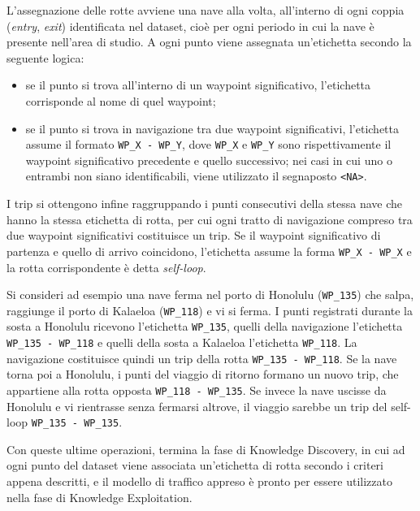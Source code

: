 L'assegnazione delle rotte avviene una nave alla volta, all'interno di ogni coppia
(\emph{entry}, \emph{exit}) identificata nel dataset, cioè per ogni periodo in cui la nave è presente
nell'area di studio. A ogni punto viene assegnata un'etichetta secondo la seguente logica:
\begin{itemize}
    \item se il punto si trova all'interno di un waypoint significativo, l'etichetta
          corrisponde al nome di quel waypoint;
    \item se il punto si trova in navigazione tra due waypoint significativi, l'etichetta assume il
          formato \texttt{WP\_X - WP\_Y}, dove \texttt{WP\_X} e \texttt{WP\_Y} sono
          rispettivamente il waypoint significativo precedente e quello successivo; nei casi
          in cui uno o entrambi non siano identificabili, viene utilizzato il
          segnaposto \texttt{<NA>}.
\end{itemize}
I trip si ottengono infine raggruppando i punti consecutivi della stessa nave che hanno la stessa
etichetta di rotta, per cui ogni tratto di navigazione compreso tra due waypoint significativi
costituisce un trip. Se il waypoint significativo di partenza e quello di arrivo coincidono, l'etichetta
assume la forma
\texttt{WP\_X - WP\_X} e la rotta corrispondente è detta \emph{self-loop}.

Si consideri ad esempio una nave ferma nel porto di Honolulu (\texttt{WP\_135}) che salpa, raggiunge
il porto di Kalaeloa (\texttt{WP\_118}) e vi si ferma. I punti registrati durante la sosta a Honolulu
ricevono l'etichetta \texttt{WP\_135}, quelli della navigazione l'etichetta \texttt{WP\_135 - WP\_118}
e quelli della sosta a Kalaeloa l'etichetta \texttt{WP\_118}. La navigazione costituisce quindi un trip
della rotta \texttt{WP\_135 - WP\_118}. Se la nave torna poi a Honolulu, i punti del viaggio di ritorno
formano un nuovo trip, che appartiene alla rotta opposta \texttt{WP\_118 - WP\_135}. Se invece la nave
uscisse da Honolulu e vi rientrasse senza fermarsi altrove, il viaggio sarebbe un trip del self-loop
\texttt{WP\_135 - WP\_135}.

Con queste ultime operazioni, termina la fase di Knowledge Discovery, in cui ad ogni punto
del dataset viene associata un'etichetta di rotta secondo i criteri appena descritti, e il
modello di traffico appreso è pronto per essere utilizzato nella fase di Knowledge
Exploitation.

